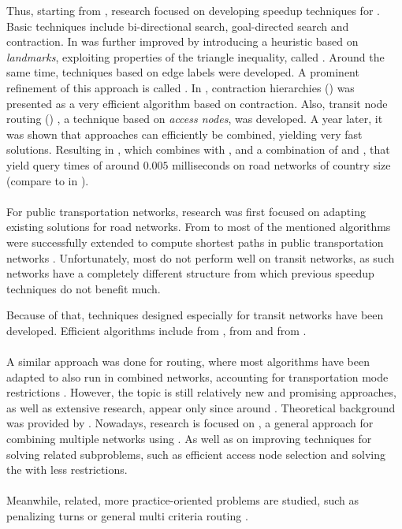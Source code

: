 	Thus, starting from , research focused on developing speedup techniques for \dijkstra. Basic techniques include
	bi-directional search, goal-directed search and contraction. In  \astar was further
	improved by introducing a heuristic based on \textit{landmarks}, exploiting properties of the triangle inequality,
	called \alt {}. Around the same time, techniques based on edge labels were developed. A prominent refinement of this
	approach is called \arcFlags {}. In , contraction hierarchies (\ch)  was presented as a
	very efficient algorithm based on contraction. Also, transit node routing (\tnr) , a technique based on \textit{access nodes},
	was developed. A year later, it was shown that approaches can efficiently be combined, yielding very fast solutions.
	Resulting in \chase {}, which combines \ch with \arcFlags, and a combination of \tnr and \arcFlags, that yield query times
	of around $0.005$ milliseconds on road networks of country size (compare to 
	in ).\\\\
	For public transportation networks, research was first focused on adapting existing solutions for road networks.
	From  to  most of the mentioned algorithms were successfully extended to compute shortest
	paths in public transportation networks .
	Unfortunately, most do not perform well on transit networks, as such networks have a completely different structure from which
	previous speedup techniques do not benefit much.
	
	Because of that, techniques designed especially for transit networks have been developed. Efficient algorithms include \transferPatterns
	 from , \raptor {} from  and \csa {} from .\\\\
	A similar approach was done for \multiModal routing, where most algorithms have been adapted to also run in combined networks,
	accounting for transportation mode restrictions .
	However, the topic is still relatively new and promising approaches, as well as extensive research, appear only since around
	. Theoretical background was provided by .
	Nowadays, research is focused on \anr {}, a general approach for combining
	multiple networks using . As well as on improving techniques for solving related subproblems, such as
	efficient access node selection and solving the \lcspp {} with less restrictions.\\\\
	Meanwhile, related, more practice-oriented problems are studied, such as penalizing turns 
	or general multi criteria routing .

